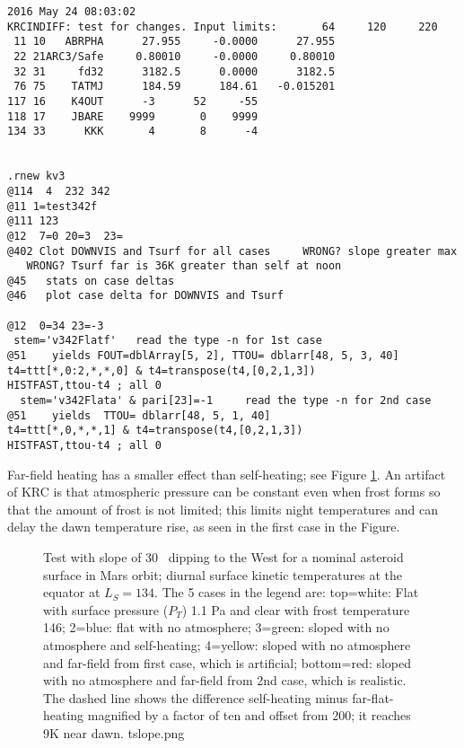 \begin{verbatim}
2016 May 24 08:03:02
KRCINDIFF: test for changes. Input limits:       64     120     220
 11 10   ABRPHA      27.955     -0.0000      27.955
 22 21ARC3/Safe     0.80010     -0.0000     0.80010
 32 31     fd32      3182.5      0.0000      3182.5
 76 75    TATMJ      184.59      184.61   -0.015201
117 16    K4OUT      -3      52     -55
118 17    JBARE    9999       0    9999
134 33      KKK       4       8      -4


.rnew kv3
@114  4  232 342
@11 1=test342f
@111 123
@12  7=0 20=3  23=
@402 Clot DOWNVIS and Tsurf for all cases     WRONG? slope greater max
   WRONG? Tsurf far is 36K greater than self at noon
@45   stats on case deltas
@46   plot case delta for DOWNVIS and Tsurf

@12  0=34 23=-3
 stem='v342Flatf'   read the type -n for 1st case 
@51    yields FOUT=dblArray[5, 2], TTOU= dblarr[48, 5, 3, 40]
t4=ttt[*,0:2,*,*,0] & t4=transpose(t4,[0,2,1,3])
HISTFAST,ttou-t4 ; all 0
  stem='v342Flata' & pari[23]=-1     read the type -n for 2nd case 
@51    yields  TTOU= dblarr[48, 5, 1, 40]
t4=ttt[*,0,*,*,1] & t4=transpose(t4,[0,2,1,3])
HISTFAST,ttou-t4 ; all 0

\end{verbatim}
Far-field heating has a smaller effect than self-heating; see Figure
\ref{tslope}.  An artifact of KRC is that atmospheric pressure can be constant
even when frost forms so that the amount of frost is not limited; this limits
night temperatures and can delay the dawn temperature rise, as seen in the first
case in the Figure.
\begin{figure}[!ht] 
\caption[Effect of far heating]{Test with slope of 30\qd~ dipping to the West
  for a nominal asteroid surface in Mars orbit; diurnal surface kinetic
  temperatures at the equator at $L_S=134$. The 5 cases in the legend are:
  top=white: Flat with surface pressure ($P_T$) 1.1 Pa and clear with frost
  temperature 146; 2=blue: flat with no atmosphere; 3=green: sloped with no
  atmosphere and self-heating; 4=yellow: sloped with no atmosphere and far-field
  from first case, which is artificial; bottom=red: sloped with no atmosphere
  and far-field from 2nd case, which is realistic. The dashed line shows the
  difference self-heating minus far-flat-heating magnified by a factor of ten
  and offset from 200; it reaches 9K near dawn.
\label{tslope}  tslope.png }
\end{figure} 



